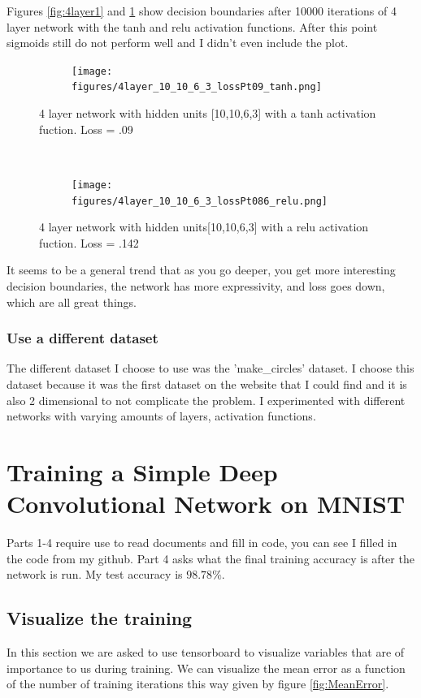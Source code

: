 \documentclass[]{article}
\begin{document}
Figures \ref{fig:4layer1} and \ref{fig:4layer3} show decision boundaries after 10000 iterations of 4 layer network with the tanh and relu activation functions. After this point sigmoids still do not perform well and I didn't even include the plot. 

\begin{figure}[ht]
    \centering
    \begin{subfigure}
        \centering
        \texttt{[image: figures/4layer\_10\_10\_6\_3\_lossPt09\_tanh.png]}
    \end{subfigure}%
    \caption{4 layer network with hidden units [10,10,6,3] with a tanh activation fuction. Loss = .09}
 \label{fig:4layer1}
    ~ 
    \begin{subfigure}
        \centering
        \texttt{[image: figures/4layer\_10\_10\_6\_3\_lossPt086\_relu.png]}
    \end{subfigure}
    \caption{4 layer network with hidden units[10,10,6,3] with a relu activation fuction. Loss = .142}
 \label{fig:4layer3}
\end{figure}

It seems to be a general trend that as you go deeper, you get more interesting decision boundaries, the network has more expressivity, and loss goes down, which are all great things. 

\subsubsection{Use a different dataset}
The different dataset I choose to use was the 'make\_circles' dataset. I choose this dataset because it was the first dataset on the website that I could find and it is also 2 dimensional to not complicate the problem. I experimented with different networks with varying amounts of layers, activation functions. 

\section{Training a Simple Deep Convolutional Network on MNIST}
Parts 1-4 require use to read documents and fill in code, you can see I filled in the code from my github. Part 4 asks what the final training accuracy is after the network is run. My test accuracy is $98.78\%$.
\subsection{Visualize the training}
In this section we are asked to use tensorboard to visualize variables that are of importance to us during training. We can visualize the mean error as a function of the number of training iterations this way given by figure \ref{fig:MeanError}.
\end{document}
